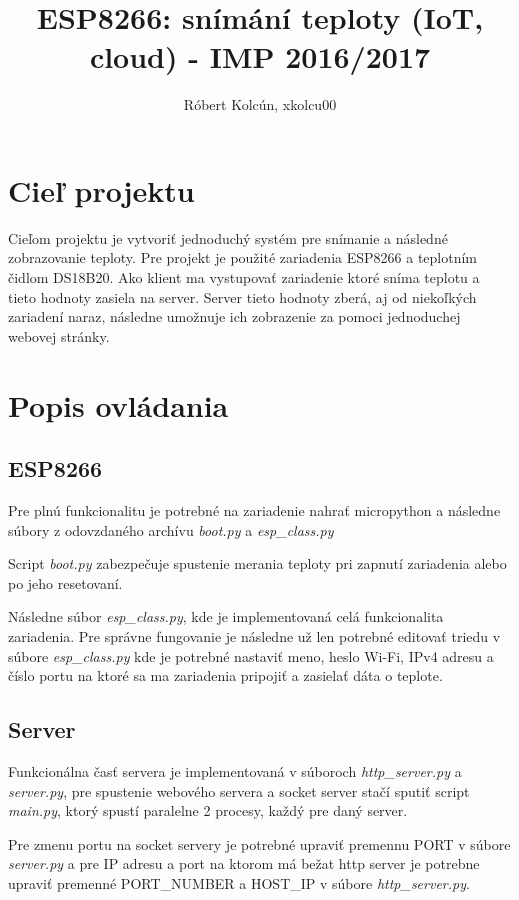 \documentclass{article}
\begin{document}
\title{ESP8266: snímání teploty (IoT, cloud) - IMP 2016/2017}
\author{Róbert Kolcún, xkolcu00}
\maketitle

\section{Cieľ projektu}
Cieľom projektu je vytvoriť jednoduchý systém pre snímanie a následné zobrazovanie teploty.
Pre projekt je použité zariadenia ESP8266 a teplotním čidlom DS18B20.
Ako klient ma vystupovať zariadenie ktoré sníma teplotu a tieto hodnoty zasiela na server.
Server tieto hodnoty zberá, aj od niekoľkých zariadení naraz, následne umožnuje ich zobrazenie za pomoci jednoduchej webovej stránky.

\section{Popis ovládania}
\subsection{ESP8266}
Pre plnú funkcionalitu je potrebné na zariadenie nahrať micropython \cite{odkaz:micropython} a následne súbory
z odovzdaného archívu \textit{boot.py} a \textit{esp\_class.py}

Script \textit{boot.py} zabezpečuje spustenie merania teploty pri zapnutí zariadenia
alebo po jeho resetovaní.

Následne súbor \textit{esp\_class.py}, kde je implementovaná celá funkcionalita zariadenia.
Pre správne fungovanie je následne už len potrebné editovať triedu v súbore \textit{esp\_class.py} kde je potrebné
nastaviť meno, heslo Wi-Fi, IPv4 adresu a číslo portu na ktoré sa ma zariadenia pripojiť a zasielať dáta o teplote.

\subsection{Server}
Funkcionálna časť servera je implementovaná v súboroch \textit{http\_server.py} a \textit{server.py},
pre spustenie webového servera a socket server stačí sputiť script \textit{main.py}, ktorý spustí paralelne 2 procesy, každý pre daný server.

Pre zmenu portu na socket servery je potrebné upraviť premennu PORT v súbore \textit{server.py} a pre IP adresu a port na ktorom
má bežat http server je potrebne upraviť premenné PORT\_NUMBER a HOST\_IP v súbore \textit{http\_server.py}.
\end{document}
